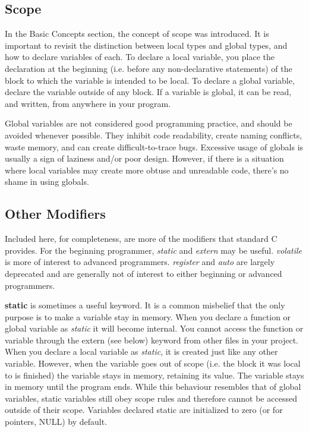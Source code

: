 \subsection{Scope}
In the Basic Concepts section, the concept of scope was introduced. It is
important to revisit the distinction between local types and global types, and
how to declare variables of each. To declare a local variable, you place the
declaration at the beginning (i.e. before any non-declarative statements) of
the block to which the variable is intended to be local. To declare a global
variable, declare the variable outside of any block. If a variable is global,
it can be read, and written, from anywhere in your program.

Global variables are not considered good programming practice, and should be
avoided whenever possible. They inhibit code readability, create naming
conflicts, waste memory, and can create difficult-to-trace bugs. Excessive
usage of globals is usually a sign of laziness and/or poor design. However, if
there is a situation where local variables may create more obtuse and
unreadable code, there's no shame in using globals.

\subsection{Other Modifiers}
Included here, for completeness, are more of the modifiers that standard C
provides. For the beginning programmer, \emph{static} and \emph{extern} may be
useful. \emph{volatile} is more of interest to advanced programmers.
\emph{register} and \emph{auto} are largely deprecated and are generally not of
interest to either beginning or advanced programmers.

\textbf{static} is sometimes a useful keyword.  It is a common misbelief that
the only purpose is to make a variable stay in memory. When you declare a
function or global variable as \emph{static} it will become internal. You
cannot access the function or variable through the extern (see below) keyword
from other files in your project. When you declare a local variable as
\emph{static}, it is created just like any other variable. However, when the
variable goes out of scope (i.e. the block it was local to is finished) the
variable stays in memory, retaining its value. The variable stays in memory
until the program ends. While this behaviour resembles that of global
variables, static variables still obey scope rules and therefore cannot be
accessed outside of their scope. Variables declared static are initialized to
zero (or for pointers, NULL) by default. 

